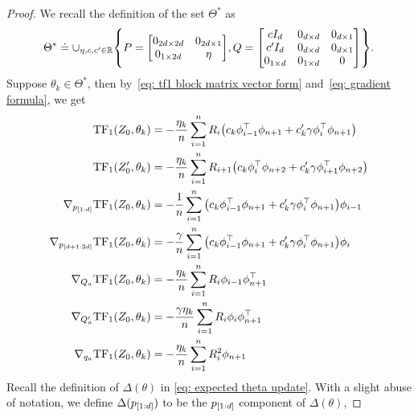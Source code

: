 \documentclass{article}
\newcommand{\R}{\mathbb{R}}
\newcommand{\tf}{\text{TF}}
\begin{document}
\begin{proof}
    We recall the definition of the set $\Theta^*$ as
    \begin{align} \label{eq:tf_simplified}
        \Theta^* \doteq
        \cup_{\eta, c, c' \in \R}
        \qty{P = \mqty[0_{2d \times 2d} & 0_{2d \times 1} \\ 0_{1 \times 2d} & \eta],
        Q =  \mqty[c I_d & 0_{d \times d} & 0_{d \times 1} \\c'I_d  & 0_{d \times d} & 0_{d \times 1} \\ 0_{1 \times d} & 0_{1 \times d} & 0]}.
    \end{align}
    Suppose $\theta_k \in \Theta^*$, then by~\eqref{eq: tf1 block matrix vector form} and~\eqref{eq: gradient formula}, we get
    \begin{align}
         \tf_1(Z_0, \theta_k)
         &= -\frac{\eta_k}{n}\sum_{i=1}^n  R_i \qty( c_k \phi_{i-1}^\top \phi_{n+1} + c'_k \gamma \phi_{i}^\top \phi_{n+1}) \label{eq: tf1 theta belongs to Theta}\\
         \tf_1(Z'_0, \theta_k)
         &= -\frac{\eta_k}{n}\sum_{i=1}^n  R_{i+1} \qty( c_k \phi_{i}^\top \phi_{n+2} + c'_k \gamma \phi_{i+1}^\top \phi_{n+2}) \label{eq: tf1 prime theta belongs to Theta}\\
         \nabla_{p_{[1:d]}} \tf_1(Z_0, \theta_k)
         & = -\frac{1}{n}\sum_{i=1}^n \qty( c_k \phi_{i-1}^\top \phi_{n+1} + c'_k \gamma \phi_{i}^\top \phi_{n+1})\phi_{i-1}
         \label{eq: tf1 p[1:d] grad theta belongs to Theta}\\
         \nabla_{p_{[d+1:2d]}} \tf_1(Z_0, \theta_k)
         & = -\frac{\gamma}{n}\sum_{i=1}^n \qty( c_k \phi_{i-1}^\top \phi_{n+1} + c'_k \gamma \phi_{i}^\top \phi_{n+1})\phi_i
         \label{eq: tf1 p[d+1:2d] grad theta belongs to Theta}\\
         \nabla_{Q_a} \tf_1(Z_0, \theta_k)
         & = -\frac{\eta_k}{n} \sum_{i=1}^n R_i  \phi_{i-1} \phi_{n+1}^\top
         \label{eq: tf1 Q_a grad theta belongs to Theta}\\
         \nabla_{Q'_a} \tf_1(Z_0, \theta_k)
         & = -\frac{\gamma \eta_k}{n} \sum_{i=1}^n  R_i  \phi_i \phi_{n+1}^\top
         \label{eq: tf1 Q'_a grad theta belongs to Theta}\\
         \nabla_{q_a} \tf_1(Z_0, \theta_k)
         & = -\frac{\eta_k}{n} \sum_{i=1}^n  R_i^2 \phi_{n+1}
         \label{eq: tf1 q_a grad theta belongs to Theta}
    \end{align}
Recall the definition of $\Delta(\theta)$ in \eqref{eq: expected theta update}. With a slight abuse of notation, we define $\Delta(p_\qty[{1:d}])$ to be the $p_\qty[{1:d}]$ component of $\Delta(\theta)$,

\end{proof}
\end{document}
